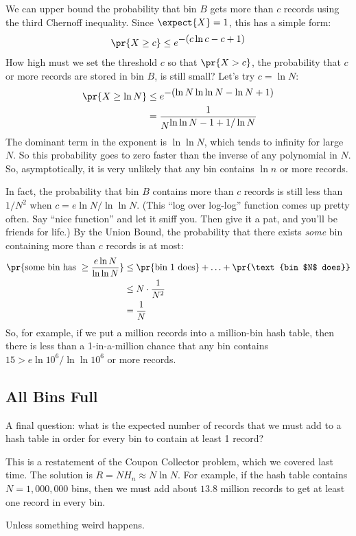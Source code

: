 \begin{editingnotes}
We can upper bound the probability that bin $B$ gets more than $c$
records using the third Chernoff inequality.  Since $\expect{X} = 1$, this
has a simple form:
%
\begin{align*}
\pr{X \geq c} \leq e^{\textstyle -(c \ln c - c + 1)}
\end{align*}
%
How high must we set the threshold $c$ so that $\pr{X > c}$, the
probability that $c$ or more records are stored in bin $B$, is still
small?  Let's try $c = \ln N$:
%
\begin{align*}
\pr{X \geq \ln{N}}
    & \leq e^{\textstyle -(\ln N \ln \ln N - \ln N + 1)} \\
    & = \frac{1}{N^{\displaystyle \ln \ln N - 1 + 1 / \ln N}}
\end{align*}
%
The dominant term in the exponent is $\ln \ln N$, which tends to
infinity for large $N$.  So this probability goes to zero faster than
the inverse of any polynomial in $N$.  So, asymptotically, it is very
unlikely that any bin contains $\ln n$ or more records.

In fact, the probability that bin $B$ contains more than $c$ records
is still less than $1 / N^2$ when $c = e \ln N / \ln \ln N$.  (This
``log over log-log'' function comes up pretty often.  Say ``nice
function'' and let it sniff you.  Then give it a pat, and you'll be
friends for life.)  By the Union Bound, the probability that there
exists \textit{some} bin containing more than $c$ records is at most:
%
\begin{align*}
\pr{\text{some bin has } \geq \frac{e \ln N}{\ln \ln N}}
    &\leq \pr{\text{bin 1 does}} + \ldots + 
          \pr{\text{bin $N$ does}} \\
    & \leq N \cdot \frac{1}{N^2} \\
    & = \frac{1}{N}
\end{align*}
%
So, for example, if we put a million records into a million-bin hash
table, then there is less than a 1-in-a-million chance that any bin
contains $15 > e \ln 10^6 / \ln \ln 10^6$ or more records.

\subsection{All Bins Full}

A final question: what is the expected number of records that we must
add to a hash table in order for every bin to contain at least 1
record?

This is a restatement of the Coupon Collector problem, which we
covered last time.  The solution is $R = N H_n \approx N \ln N$.  For
example, if the hash table contains $N = 1,000,000$ bins, then we must
add about $13.8$ million records to get at least one record in every
bin.

Unless something weird happens.
\end{editingnotes}
